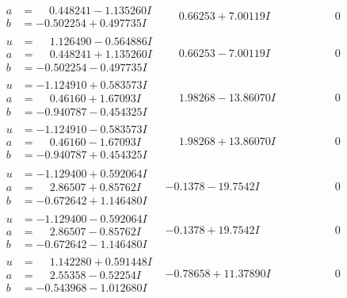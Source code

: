 \documentclass[1p]{elsarticle_modified}
\theoremstyle{definition}
\begin{document}
$$\begin{array}{c|c|c}
\begin{aligned}
a &= \phantom{-}0.448241 - 1.135260 I \\
b &= -0.502254 + 0.497735 I\end{aligned}
 & \phantom{-}0.66253 + 7.00119 I & \phantom{-0.000000 } 0 \\ \hline\begin{aligned}
u &= \phantom{-}1.126490 - 0.564886 I \\
a &= \phantom{-}0.448241 + 1.135260 I \\
b &= -0.502254 - 0.497735 I\end{aligned}
 & \phantom{-}0.66253 - 7.00119 I & \phantom{-0.000000 } 0 \\ \hline\begin{aligned}
u &= -1.124910 + 0.583573 I \\
a &= \phantom{-}0.46160 + 1.67093 I \\
b &= -0.940787 - 0.454325 I\end{aligned}
 & \phantom{-}1.98268 - 13.86070 I & \phantom{-0.000000 } 0 \\ \hline\begin{aligned}
u &= -1.124910 - 0.583573 I \\
a &= \phantom{-}0.46160 - 1.67093 I \\
b &= -0.940787 + 0.454325 I\end{aligned}
 & \phantom{-}1.98268 + 13.86070 I & \phantom{-0.000000 } 0 \\ \hline\begin{aligned}
u &= -1.129400 + 0.592064 I \\
a &= \phantom{-}2.86507 + 0.85762 I \\
b &= -0.672642 + 1.146480 I\end{aligned}
 & -0.1378 - 19.7542 I & \phantom{-0.000000 } 0 \\ \hline\begin{aligned}
u &= -1.129400 - 0.592064 I \\
a &= \phantom{-}2.86507 - 0.85762 I \\
b &= -0.672642 - 1.146480 I\end{aligned}
 & -0.1378 + 19.7542 I & \phantom{-0.000000 } 0 \\ \hline\begin{aligned}
u &= \phantom{-}1.142280 + 0.591448 I \\
a &= \phantom{-}2.55358 - 0.52254 I \\
b &= -0.543968 - 1.012680 I\end{aligned}
 & -0.78658 + 11.37890 I & \phantom{-0.000000 } 0 \\ \hline\begin{aligned}

\end{aligned}
\end{array}$$
\end{document}

